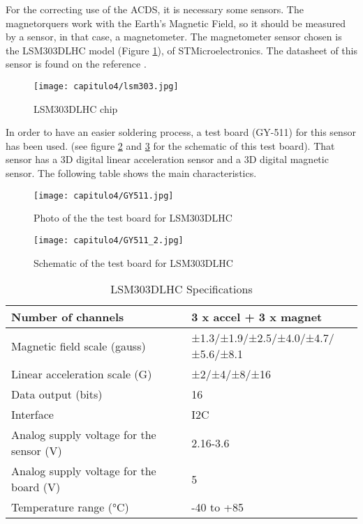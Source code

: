 For the correcting use of the \acrshort{ACDS}, it is necessary some sensors.  The magnetorquers work with the Earth's Magnetic Field, so it should be measured by a sensor, in that case, a magnetometer. The magnetometer sensor chosen is the LSM303DLHC model (Figure \ref{fig:LSM303}), of STMicroelectronics. The datasheet of this sensor is found on the reference \cite{lsm303}. 
  
\begin{figure}[H]
	\centering
		\texttt{[image: capitulo4/lsm303.jpg]}
	\caption{LSM303DLHC chip \cite{lsm303}}
	\label{fig:LSM303}
\end{figure}
In order to have an easier soldering process, a test board (GY-511) for this sensor has been used. (see figure \ref{fig:GY511} and \ref{fig:GY511_2} for the schematic of this test board).
That sensor has a 3D digital linear acceleration sensor and a 3D digital magnetic sensor. The following table shows the main characteristics.
  
\begin{figure}[H]
	\centering
		\texttt{[image: capitulo4/GY511.jpg]}
	\caption{Photo of the the test board for LSM303DLHC}
	\label{fig:GY511}
\end{figure}

  
\begin{figure}[H]
	\centering
		\texttt{[image: capitulo4/GY511\_2.jpg]}
	\caption{Schematic of the test board for LSM303DLHC \cite{LSM303board}}
	\label{fig:GY511_2}
\end{figure}

\begin{table}[H]
\centering
\begin{tabular}{|l|l|}
\hline
Number of channels & 3 x accel + 3 x magnet \\ \hline
Magnetic field scale        (gauss)     & ±1.3/±1.9/±2.5/±4.0/±4.7/±5.6/±8.1     \\ \hline
Linear acceleration scale     (G)         &  ±2/±4/±8/±16         \\ \hline
Data output (bits)          & 16                                               \\ \hline
Interface        & I2C                          \\ \hline
Analog supply voltage for the sensor (V) & 2.16-3.6                                      \\ \hline
Analog supply voltage for the board (V)     & 5         \\ \hline
Temperature range (°C)  & -40 to +85                                          \\ \hline
\end{tabular}
\caption{LSM303DLHC Specifications \cite{lsm303} }\label{tab:LSM303tab}
\end{table}

